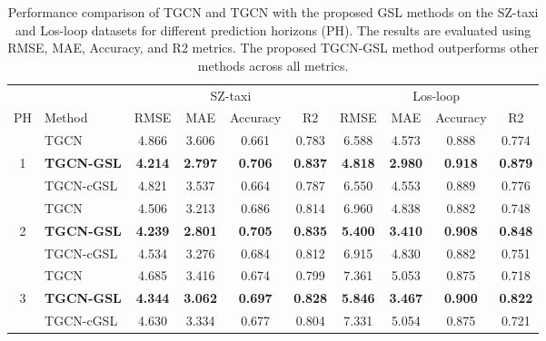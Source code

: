 \documentclass[pdflatex,sn-mathphys-num]{sn-jnl}%
\theoremstyle{thmstyleone}%
\theoremstyle{thmstyletwo}%
\theoremstyle{thmstylethree}%
\begin{document}
\begin{table}[t]
\centering
\caption{Performance comparison of TGCN and TGCN with the proposed GSL methods on the SZ-taxi and Los-loop datasets for different prediction horizons (PH). The results are evaluated using RMSE, MAE, Accuracy, and R2 metrics. The proposed TGCN-GSL method outperforms other methods across all metrics.}
\label{tab:tgcn_gsl_comparison_combined}
\begin{tabular}{cl|cccc|cccc}
  \toprule
    &          & \multicolumn{4}{c}{SZ-taxi} & \multicolumn{4}{c}{Los-loop} \\
  PH        &     Method             &         RMSE &             MAE &        Accuracy &              R2 &            RMSE &             MAE &        Accuracy &              R2 \\
  \midrule
  &             TGCN &          4.866 &          3.606 &          0.661 &          0.783 &          6.588 &          4.573 &          0.888 &          0.774 \\
 1 &  \textbf{TGCN-GSL} & \textbf{4.214} & \textbf{2.797} & \textbf{0.706} & \textbf{0.837} & \textbf{4.818} & \textbf{2.980} & \textbf{0.918} & \textbf{0.879} \\
  & TGCN-cGSL &          4.821 &          3.537 &          0.664 &          0.787 &          6.550 &          4.553 &          0.889 &          0.776 \\
 \hdashline
  &             TGCN &          4.506 &          3.213 &          0.686 &          0.814 &          6.960 &          4.838 &          0.882 &          0.748 \\
 2 &  \textbf{TGCN-GSL} & \textbf{4.239} & \textbf{2.801} & \textbf{0.705} & \textbf{0.835} & \textbf{5.400} & \textbf{3.410} & \textbf{0.908} & \textbf{0.848} \\
  & TGCN-cGSL &          4.534 &          3.276 &          0.684 &          0.812 &          6.915 &          4.830 &          0.882 &          0.751 \\
 \hdashline
  &             TGCN &          4.685 &          3.416 &          0.674 &          0.799 &          7.361 &          5.053 &          0.875 &          0.718 \\
 3 &  \textbf{TGCN-GSL} & \textbf{4.344} & \textbf{3.062} & \textbf{0.697} & \textbf{0.828} & \textbf{5.846} & \textbf{3.467} & \textbf{0.900} & \textbf{0.822} \\
  & TGCN-cGSL &          4.630 &          3.334 &          0.677 &          0.804 &          7.331 &          5.054 &          0.875 &          0.721 \\

\end{tabular}
\end{table}
\end{document}
